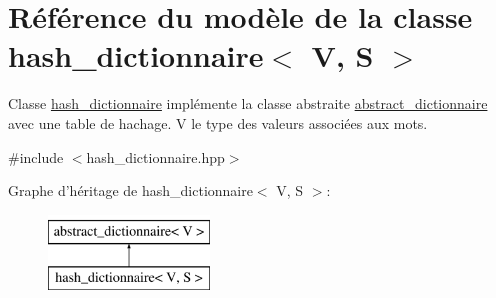 \hypertarget{classhash__dictionnaire}{\section{Référence du modèle de la classe hash\-\_\-dictionnaire$<$ V, S $>$}
\label{classhash__dictionnaire}
}


Classe \hyperlink{classhash__dictionnaire}{hash\-\_\-dictionnaire} implémente la classe abstraite \hyperlink{classabstract__dictionnaire}{abstract\-\_\-dictionnaire} avec une table de hachage. V le type des valeurs associées aux mots.  




{\ttfamily \#include $<$hash\-\_\-dictionnaire.\-hpp$>$}

Graphe d'héritage de hash\-\_\-dictionnaire$<$ V, S $>$\-:\begin{figure}[H]
\begin{center}
\leavevmode
\includegraphics[height=2.000000cm]{classhash__dictionnaire}
\end{center}
\end{figure}

